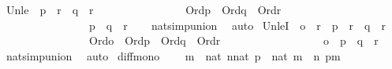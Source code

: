 \begin{isabellebody}
\isanewline
%
\endisadelimproof
\isanewline
{}\isamarkupfalse%
\ Un{\isacharunderscore}{\kern0pt}le\ {\isacharcolon}{\kern0pt}\ {\isachardoublequoteopen}p\ {\isasymle}\ r\ {\isasymLongrightarrow}\ q\ {\isasymle}\ r\ {\isasymLongrightarrow}\isanewline
\ \ \ \ \ \ \ \ \ \ \ \ \ \ \ Ord{\isacharparenleft}{\kern0pt}p{\isacharparenright}{\kern0pt}\ {\isasymLongrightarrow}\ Ord{\isacharparenleft}{\kern0pt}q{\isacharparenright}{\kern0pt}\ {\isasymLongrightarrow}\ Ord{\isacharparenleft}{\kern0pt}r{\isacharparenright}{\kern0pt}\ {\isasymLongrightarrow}\ \isanewline
\ \ \ \ \ \ \ \ \ \ \ \ \ \ \ \ p\ {\isasymunion}\ q\ {\isasymle}\ r{\isachardoublequoteclose}\isanewline
%
\isadelimproof
\ \ %
\endisadelimproof
%
\isatagproof
{}\isamarkupfalse%
\ nat{\isacharunderscore}{\kern0pt}simp{\isacharunderscore}{\kern0pt}union\ \isamarkupfalse%
\ auto%
\endisatagproof
{\isafoldproof}%
%
\isadelimproof
\isanewline
%
\endisadelimproof
\isanewline
{}\isamarkupfalse%
\ Un{\isacharunderscore}{\kern0pt}leI{}\ {\isacharcolon}{\kern0pt}\ {\isachardoublequoteopen}o\ {\isasymle}\ r\ {\isasymLongrightarrow}\ p\ {\isasymle}\ r\ {\isasymLongrightarrow}\ q\ {\isasymle}\ r\ {\isasymLongrightarrow}\ \isanewline
\ \ \ \ \ \ \ \ \ \ \ \ \ \ \ \ Ord{\isacharparenleft}{\kern0pt}o{\isacharparenright}{\kern0pt}\ {\isasymLongrightarrow}\ Ord{\isacharparenleft}{\kern0pt}p{\isacharparenright}{\kern0pt}\ {\isasymLongrightarrow}\ Ord{\isacharparenleft}{\kern0pt}q{\isacharparenright}{\kern0pt}\ {\isasymLongrightarrow}\ Ord{\isacharparenleft}{\kern0pt}r{\isacharparenright}{\kern0pt}\ {\isasymLongrightarrow}\ \isanewline
\ \ \ \ \ \ \ \ \ \ \ \ \ \ \ \ o\ {\isasymunion}\ p\ {\isasymunion}\ q\ {\isasymle}\ r{\isachardoublequoteclose}\isanewline
%
\isadelimproof
\ \ %
\endisadelimproof
%
\isatagproof
{}\isamarkupfalse%
\ nat{\isacharunderscore}{\kern0pt}simp{\isacharunderscore}{\kern0pt}union\ \isamarkupfalse%
\ auto%
\endisatagproof
{\isafoldproof}%
%
\isadelimproof
\isanewline
%
\endisadelimproof
\isanewline
{}\isamarkupfalse%
\ diff{\isacharunderscore}{\kern0pt}mono\ {\isacharcolon}{\kern0pt}\isanewline
\ \ \ {\isachardoublequoteopen}m\ {\isasymin}\ nat{\isachardoublequoteclose}\ {\isachardoublequoteopen}n{\isasymin}nat{\isachardoublequoteclose}\ {\isachardoublequoteopen}p\ {\isasymin}\ nat{\isachardoublequoteclose}\ {\isachardoublequoteopen}m\ {\isacharless}{\kern0pt}\ n{\isachardoublequoteclose}\ {\isachardoublequoteopen}p{\isasymle}m{\isachardoublequoteclose}\isanewline

\end{isabellebody}

